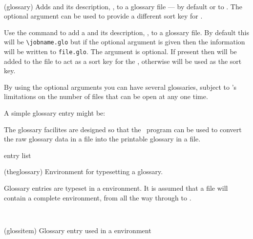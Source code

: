 \begin{syntax}
\cmd{\glossary} \\
\end{syntax}
\glossary(glossary)%
  {}%
  {Adds  and its description, , to a glossary file ---
    by default or to . The optional argument
    can be used to provide a different sort key for .}

Use the \cmd{\glossary} command to add a  and its description,
,
to a glossary file. By default this will be \verb?\jobname.glo? but if the
optional  argument is given then the information will be written
to \verb?file.glo?. The  argument is optional. If present then
 will be added to the file to act as a sort key for the ,
otherwise  will be used as the sort key.

    By using the optional  arguments you can have several 
glossaries, subject to \tx's limitations on the number of files that can
be open at any one time.

   A simple glossary entry might be:
\begin{lcode}
\end{lcode}

    The glossary facilites are designed so that the \Lmakeindex\ program
can be used to convert the raw glossary data in a  file into
the printable glossary in a  file.

\begin{syntax}
 entry list  \\
\end{syntax}
\glossary(theglossary)%
  {}%
  {Environment for typesetting a glossary.}%

Glossary entries are typeset in a  environment. It is assumed
that a  file will contain a complete  environment,
from  all the way through to .

\begin{syntax}
\cmd{\glossitem} \\
\end{syntax}
\glossary(glossitem)%
  {}%
  {Glossary entry used in a  environment}%

